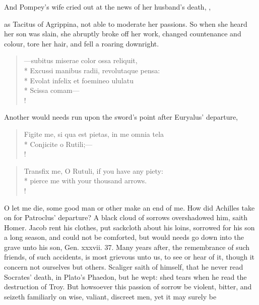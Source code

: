 {And Pompey's wife cried out at the news of her husband's death,
,

as Tacitus of Agrippina, not able to moderate her passions. So
when she heard her son was slain, she abruptly broke off her work,
changed countenance and colour, tore her hair, and fell a roaring
downright.
%
%
\begin{latin}%
\begin{verse}%
---subitus miserae color ossa reliquit,\\*
Excussi manibus radii, revolutaque pensa:\\*
Evolat infelix et foemineo ululatu\\*
Scissa comam---\\!
\end{verse}%
\end{latin}%
%
Another would needs run upon the sword's point after Euryalus'
departure,
%
%
\begin{latin}%
\begin{verse}%
Figite me, si qua est pietas, in me omnia tela\\*
Conjicite o Rutili;---\\!
\end{verse}%
\end{latin}%
\translationrule%
\begin{verse}%
Transfix me, O Rutuli, if you have any piety:\\*
pierce me with your thousand arrows.\\!
\end{verse}%
%
O let me die, some good man or other make an end of me. How did
Achilles take on for Patroclus' departure? A black cloud of sorrows
overshadowed him, saith Homer. Jacob rent his clothes, put sackcloth
about his loins, sorrowed for his son a long season, and could not be
comforted, but would needs go down into the grave unto his son, Gen.
xxxvii. 37. Many years after, the remembrance of such friends, of such
accidents, is most grievous unto us, to see or hear of it, though it
concern not ourselves but others. Scaliger saith of himself, that he
never read Socrates' death, in Plato's Phaedon, but he wept:
\Austin{} shed tears when he read the destruction of Troy. But
howsoever this passion of sorrow be violent, bitter, and seizeth
familiarly on wise, valiant, discreet men, yet it may surely be
}
